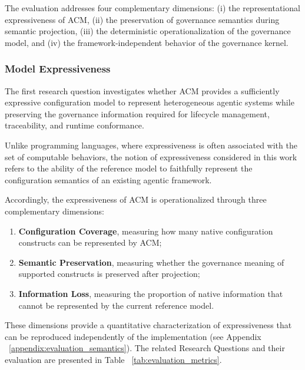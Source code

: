 \documentclass[10pt]{article}
\begin{document}
The evaluation addresses four complementary dimensions: (i) the representational expressiveness of ACM, (ii) the preservation of governance semantics during semantic projection, (iii) the deterministic operationalization of the governance model, and (iv) the framework-independent behavior of the governance kernel.

\subsubsection{Model Expressiveness}
\label{subsubsec:model_expressiveness}

The first research question investigates whether ACM provides a sufficiently
expressive configuration model to represent heterogeneous agentic systems while
preserving the governance information required for lifecycle management,
traceability, and runtime conformance.

Unlike programming languages, where expressiveness is often associated with the
set of computable behaviors, the notion of expressiveness considered in this
work refers to the ability of the reference model to faithfully represent the
configuration semantics of an existing agentic framework.

Accordingly, the expressiveness of ACM is operationalized through three
complementary dimensions:

\begin{enumerate}
	\item \textbf{Configuration Coverage}, measuring how many native
	configuration constructs can be represented by ACM;
	\item \textbf{Semantic Preservation}, measuring whether the governance
	meaning of supported constructs is preserved after projection;
	\item \textbf{Information Loss}, measuring the proportion of native
	information that cannot be represented by the current reference
	model.
\end{enumerate}

These dimensions provide a quantitative characterization of expressiveness that
can be reproduced independently of the implementation (see Appendix ~\ref{appendix:evaluation_semantics}). The related Research Questions and their evaluation are presented in Table ~\ref{tab:evaluation_metrics}.
\end{document}

